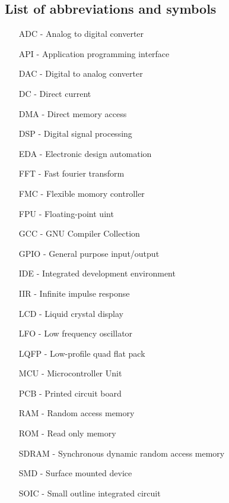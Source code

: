 \documentclass[a4paper,twoside,12pt]{book}
\begin{document}
\begin{appendices} 

\chapter*{List of abbreviations and symbols}

\begin{itemize}
\item[ADC] - Analog to digital converter
\item[API] - Application programming interface
\item[DAC] - Digital to analog converter
\item[DC] - Direct current
\item[DMA] - Direct memory access
\item[DSP] - Digital signal processing
\item[EDA] - Electronic design automation
\item[FFT] - Fast fourier transform
\item[FMC] - Flexible momory controller
\item[FPU] - Floating-point uint
\item[GCC] - GNU Compiler Collection
\item[GPIO] - General purpose input/output
\item[IDE] - Integrated development environment
\item[IIR] - Infinite impulse response
\item[LCD] - Liquid crystal display
\item[LFO] - Low frequency oscillator
\item[LQFP] - Low-profile quad flat pack
\item[MCU] - Microcontroller Unit
\item[PCB] - Printed circuit board
\item[RAM] - Random access memory
\item[ROM] - Read only memory
\item[SDRAM] - Synchronous dynamic random access memory
\item[SMD] - Surface mounted device
\item[SOIC] - Small outline integrated circuit
\end{itemize}


\end{appendices}
\end{document}
